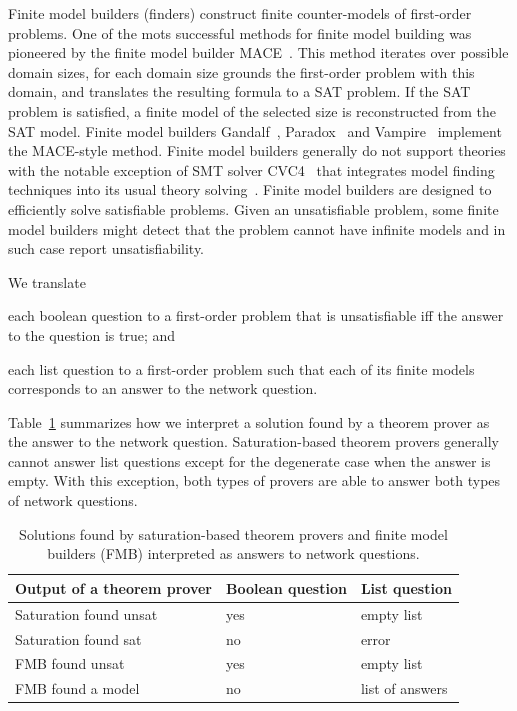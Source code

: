 Finite model builders (finders) construct finite counter-models of first-order problems. One of the mots successful methods for finite model building was pioneered by the finite model builder MACE~\cite{mccune1994davis}. This method iterates over possible domain sizes, for each domain size grounds the first-order problem with this domain, and translates the resulting formula to a SAT problem. If the SAT problem is satisfied, a finite model of the selected size is reconstructed from the SAT model. Finite model builders Gandalf~\cite{Gandalf}, Paradox~\cite{claessen2003new} and Vampire~\cite{VampireFMB} implement the MACE-style method. Finite model builders generally do not support theories with the notable exception of SMT solver CVC4~\cite{CVC4} that integrates model finding techniques into its usual theory solving~\cite{CVC4FMB}. Finite model builders are designed to efficiently solve satisfiable problems. Given an unsatisfiable problem, some finite model builders might detect that the problem cannot have infinite models and in such case report unsatisfiability.

We translate
\begin{enumerate*}[label=(\roman*)]
  \item each boolean question to a first-order problem that is unsatisfiable iff the answer to the question is true; and
  \item each list question to a first-order problem such that each of its finite models corresponds to an answer to the network question.
\end{enumerate*}
Table~\ref{fig:fol-answering-questions} summarizes how we interpret a solution found by a theorem prover as the answer to the network question. Saturation-based theorem provers generally cannot answer list questions except for the degenerate case when the answer is empty. With this exception, both types of provers are able to answer both types of network questions. 

\begin{table}
  \center
  \begin{tabular}{lll}
    \hline
    Output of a theorem prover & Boolean question & List question \\
    \hline
    Saturation found unsat & yes & empty list \\
    Saturation found sat   & no  & error \\
    FMB found unsat        & yes & empty list \\
    FMB found a model      & no  & list of answers \\
  \end{tabular}
  \caption{Solutions found by saturation-based theorem provers and finite model builders (FMB) interpreted as answers to network questions.}
  \label{fig:fol-answering-questions}
\end{table}


